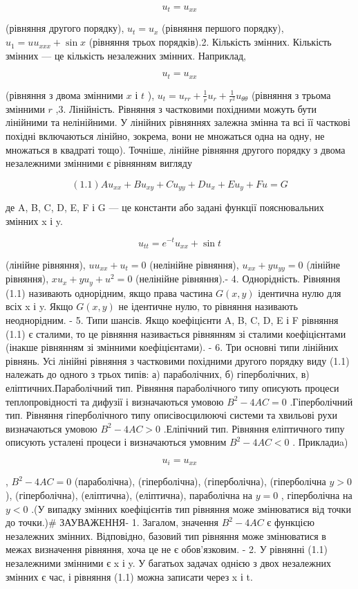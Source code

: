 \documentclass[
  ukrainian,
]{article}
\begin{document}
\[
u_t = u_{xx}
\]

(рівняння другого порядку), \(u_t = u_x\) (рівняння першого порядку),
\(u_1 = uu_{xxx} + \sin x\) (рівняння трьох порядків).2. Кількість
змінних. Кількість змінних --- це кількість незалежних змінних.
Наприклад,

\[
u_t = u_{xx}
\]

(рівняння з двома змінними \(x\) і \(t\) ),
\(u_t = u_{rr} + \frac{1}{r} u_r + \frac{1}{r^2} u_{\theta\theta}\)
(рівняння з трьома змінними \(r\) ,3. Лінійність. Рівняння з частковими
похідними можуть бути лінійними та нелінійними. У лінійних рівняннях
залежна змінна та всі її часткові похідні включаються лінійно, зокрема,
вони не множаться одна на одну, не множаться в квадраті тощо). Точніше,
лінійне рівняння другого порядку з двома незалежними змінними є
рівнянням вигляду

\[
(1.1) Au_{xx} + Bu_{xy} + Cu_{yy} + Du_x + Eu_y + Fu = G
\]

де A, B, C, D, E, F і G --- це константи або задані функції
пояснювальних змінних x і y.

\[
u_{tt} = e^{-t}u_{xx} + \sin t
\]

(лінійне рівняння), \(uu_{xx} + u_t = 0\) (нелінійне рівняння),
\(u_{xx} + yu_{yy} = 0\) (лінійне рівняння), \(xu_x + yu_y + u^2 = 0\)
(нелінійне рівняння).- 4. Однорідність. Рівняння (1.1) називають
однорідним, якщо права частина \(G(x, y)\) ідентична нулю для всіх x і
y. Якщо \(G(x, y)\) не ідентичне нулю, то рівняння називають
неоднорідним. - 5. Типи шансів. Якщо коефіцієнти A, B, C, D, E і F
рівняння (1.1) є сталими, то це рівняння називається рівнянням зі
сталими коефіцієнтами (інакше рівнянням зі змінними коефіцієнтами). - 6.
Три основні типи лінійних рівнянь. Усі лінійні рівняння з частковими
похідними другого порядку виду (1.1) належать до одного з трьох типів:
а) параболічних, б) гіперболічних, в) еліптичних.Параболічний тип.
Рівняння параболічного типу описують процеси теплопровідності та дифузії
і визначаються умовою \(B^2 - 4AC = 0\) .Гіперболічний тип. Рівняння
гіперболічного типу описівосцилюючі системи та хвильові рухи
визначаються умовою \(B^2-4AC>0\) .Еліпічний тип. Рівняння еліптичного
типу описують усталені процеси і визначаються умовним \(B^2-4AC<0\) .
Прикладиa)

\[
u_i = u_{xx}
\]

, \(B^2 - 4AC = 0\) (параболічна), (гіперболічна), (гіперболічна),
(гіперболічна \(y > 0\) ), (гіперболічна), (еліптична), (еліптична),
параболічна на \(y = 0\) , гіперболічна на \(y < 0\) .(У випадку змінних
коефіцієнтів тип рівняння може змінюватися від точки до точки.)\#
ЗАУВАЖЕННЯ- 1. Загалом, значення \(B^2-4AC\) є функцією незалежних
змінних. Відповідно, базовий тип рівняння може змінюватися в межах
визначення рівняння, хоча це не є обов'язковим. - 2. У рівнянні (1.1)
незалежними змінними є x і y. У багатьох задачах однією з двох
незалежних змінних є час, і рівняння (1.1) можна записати через x і t.
\end{document}
